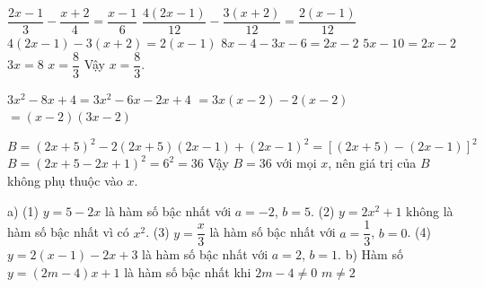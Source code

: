 \begin{problem}[8DS-PT1-004]
$\dfrac{2x - 1}{3} - \dfrac{x + 2}{4} = \dfrac{x - 1}{6}$
$\dfrac{4(2x - 1)}{12} - \dfrac{3(x + 2)}{12} = \dfrac{2(x - 1)}{12}$
$4(2x - 1) - 3(x + 2) = 2(x - 1)$
$8x - 4 - 3x - 6 = 2x - 2$
$5x - 10 = 2x - 2$
$3x = 8$
$x = \dfrac{8}{3}$
Vậy $x = \dfrac{8}{3}$.
\end{problem}

\begin{problem}[8DS-PTNT-006]
$3x^2 - 8x + 4 = 3x^2 - 6x - 2x + 4$
$= 3x(x - 2) - 2(x - 2)$
$= (x - 2)(3x - 2)$
\end{problem}

\begin{problem}[8DS-HDT-005]
\[
B = (2x + 5)^2 - 2(2x + 5)(2x - 1) + (2x - 1)^2
  = \left[(2x + 5) - (2x - 1)\right]^2
\]
$B = (2x + 5 - 2x + 1)^2 = 6^2 = 36$
Vậy $B = 36$ với mọi $x$, nên giá trị của $B$ không phụ thuộc vào $x$.
\end{problem}

\begin{problem}[8DS-HSBN-002]
a) (1) $y = 5 - 2x$ là hàm số bậc nhất với $a = -2$, $b = 5$.
(2) $y = 2x^2 + 1$ không là hàm số bậc nhất vì có $x^2$.
(3) $y = \dfrac{x}{3}$ là hàm số bậc nhất với $a = \dfrac{1}{3}$, $b = 0$.
(4) $y = 2(x - 1) - 2x + 3$ là hàm số bậc nhất với $a = 2$, $b = 1$.
b) Hàm số $y = (2m - 4)x + 1$ là hàm số bậc nhất khi $2m - 4 \neq 0$
$m \neq 2$
\end{problem}
